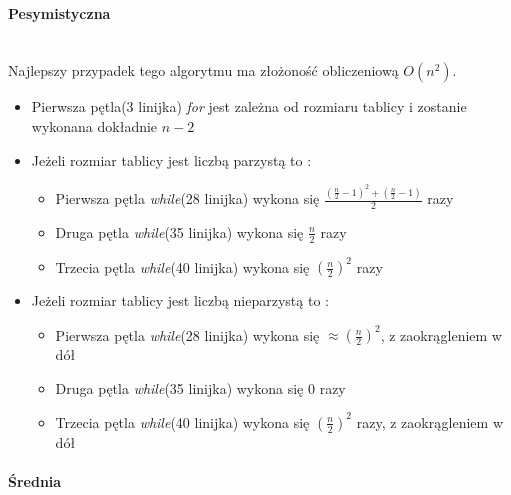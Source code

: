 \paragraph{Pesymistyczna}\mbox{}\\
Najlepszy przypadek tego algorytmu ma złożoność obliczeniową $O(n^2)$. 
\begin{itemize}
\item Pierwsza pętla(3 linijka) \textit{for} jest zależna od rozmiaru tablicy i zostanie wykonana dokładnie $n-2$
\item Jeżeli rozmiar tablicy jest liczbą parzystą to :
\begin{itemize}
\item Pierwsza pętla \textit{while}(28 linijka) wykona się $\frac{(\frac{n}{2}-1)^2+(\frac{n}{2}-1)}{2}$ razy
\item Druga pętla \textit{while}(35 linijka) wykona się $\frac{n}{2}$ razy
\item Trzecia pętla \textit{while}(40 linijka) wykona się $(\frac{n}{2})^2$ razy

\end{itemize}
\item Jeżeli rozmiar tablicy jest liczbą nieparzystą to :
\begin{itemize}
\item Pierwsza pętla \textit{while}(28 linijka) wykona się  $\approx (\frac{n}{2})^{2}$, z zaokrągleniem w dół
\item Druga pętla \textit{while}(35	 linijka) wykona się $0$ razy
\item Trzecia pętla \textit{while}(40 linijka) wykona się $(\frac{n}{2})^2$ razy, z zaokrągleniem w dół

\end{itemize}
\end{itemize}

\paragraph{Średnia}\mbox{}\\
